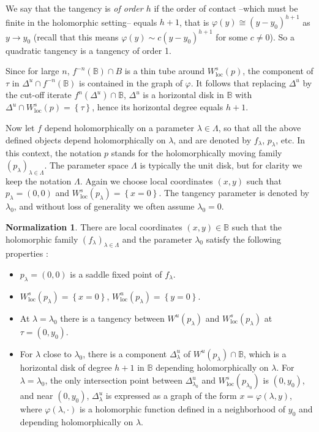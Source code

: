 \documentclass[11pt, oneside]{amsart}
\newcommand{\B}{\mathbb{B}}
\newcommand{\set}[1]{\left\{#1\right\}}
\newcommand{\lo}{{\lambda_0}}
\newcommand{\loc}{{\mathrm{loc}}}
\theoremstyle{remark}
\theoremstyle{definition}
\newtheorem{normalization}[prop]{Normalization}
\theoremstyle{theorem}
\newcommand{\commentaire}[1]{}
\begin{document}
We say that the tangency is \emph{of order $h$} if the order of contact --which must be  finite in the holomorphic setting-- 
equals $h+1$, that is  
$\varphi(y)\cong (y-y_0)^{h+1}$ as $y\to y_0$ (recall that this means $\varphi(y)\sim
c (y-y_0)^{h+1}$ for some $c\neq 0$).   So a quadratic tangency is a tangency of order 1. 

Since for large $n$, $f^{-n}(\B)\cap B$ is a thin tube around $W^s_\loc(p)$, the component of $\tau$ in 
  $\Delta^u\cap f^{-n}(\B)$ is contained in the graph of $\varphi$. It follows that replacing 
  $\Delta^u$ by the cut-off iterate $f^n(\Delta^u)\cap \B$, $\Delta^u$ is a horizontal disk in $\B$ 
  with $\Delta^u\cap W^s_\loc(p) = \set{\tau}$, hence its horizontal degree equals $h+1$. 
  
 

Now let $f$ depend holomorphically on a parameter $\lambda\in \Lambda$, so that all the above defined 
objects depend holomorphically on $\lambda$, 
and are denoted by $f_\lambda$, $p_\lambda$, etc. 
In this context, the notation  $p$ stands 
 for the holomorphically moving  family  $(p_\lambda)_{\lambda\in \Lambda}$.
The parameter space $\Lambda$ is typically the unit disk,
but for clarity we keep the notation $\Lambda$. Again we   choose  local 
 coordinates $(x,y)$ such that $p_\lambda = (0,0)$ and $W^s_\loc(p_\lambda) = \set{x=0}$. 
The tangency parameter is denoted by $\lambda_0$, and without loss of generality
 we often assume $\lambda_0 = 0$. 


\begin{normalization}\label{norm:tang}\commentaire{We make the normalization more explicit and precise for future reference (notably in \S 4.3)}
There are local coordinates $(x,y)\in \B$ such that the 
 holomorphic family $(f_\lambda)_{\lambda\in \Lambda}$ and the parameter $\lo$
satisfy  the following properties :
\begin{itemize}
\item $p_\lambda = (0,0)$ is a saddle fixed point of $f_\lambda$.
\item $W^s_\loc(p_\lambda) = \set{x=0}$, $W^u_\loc(p_\lambda) = \set{y=0}$.
\item At  $\lambda = \lo$ there is a tangency between  $W^u(p_\lambda)$ 
and $W^s_\loc(p_\lambda)$ at $\tau = (0, y_0)$. 
\item For $\lambda$ close to $\lambda_0$, there is a component 
$\Delta^u_\lambda$ of $W^u(p_\lambda)\cap \B$,  
which is a horizontal disk of degree $h+1$  in $\B$ 
depending holomorphically  on $\lambda$. For  $\lambda = \lambda_0$,  the only intersection point 
between $\Delta^u_{\lambda_0} $ and $W^s_\loc(p_{\lambda_0})$ is $(0,y_0)$, and  
near $(0,y_0)$, 
$\Delta^u_\lambda$ is expressed as a graph of the form 
$x = \varphi(\lambda, y)$, where $\varphi(\lambda, \cdot)$ is a holomorphic function defined in a neighborhood of $y_0$ and depending holomorphically  on $\lambda$.   
\end{itemize}
\end{normalization}
 
\end{document}
